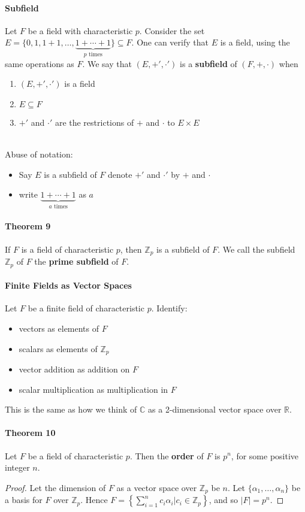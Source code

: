 \documentclass[10pt,letter]{article}
\theoremstyle{plain}
\theoremstyle{definition}
\begin{document}
\paragraph{Subfield}
Let $F$ be a field with characteristic $p$. Consider the set $E=\{0,1,1+1,\ldots,\underbrace{1+\cdots+1}_{p\text{ times}}\}\subseteq F$. One can verify that $E$ is a field, using the same operations as $F$. We say that $(E,+',\cdot')$ is a \textbf{subfield} of $(F,+,\cdot)$ when 
\begin{enumerate}
    \item $(E,+',\cdot')$ is a field 
    \item $E\subseteq F$ 
    \item $+'$ and $\cdot'$ are the restrictions of $+$ and $\cdot$ to $E\times E$
\end{enumerate}\mbox{}\\
Abuse of notation: 
\begin{itemize}
    \item Say $E$ is a subfield of $F$ denote $+'$ and $\cdot'$ by $+$ and $\cdot$
    \item write $\underbrace{1+\cdots+1}_{a\text{ times}}$ as $a$ 
\end{itemize}

\paragraph{Theorem 9}
If $F$ is a field of characteristic $p$, then $\mathbb{Z}_p$ is a subfield of $F$. We call the subfield $\mathbb{Z}_p$ of $F$ the \textbf{prime subfield} of $F$. 

\paragraph{Finite Fields as Vector Spaces}
Let $F$ be a finite field of characteristic $p$. Identify: 
\begin{itemize}
    \item vectors as elements of $F$ 
    \item scalars as elements of $\mathbb{Z}_p$ 
    \item vector addition as addition on $F$ 
    \item scalar multiplication as multiplication in $F$
\end{itemize}
This is the same as how we think of $\mathbb{C}$ as a 2-dimensional vector space over $\mathbb{R}$. 

\paragraph{Theorem 10}
Let $F$ be a field of characteristic $p$. Then the \textbf{order} of $F$ is $p^n$, for some positive integer $n$. 
\begin{proof}
     Let the dimension of $F$ as a vector space over $\mathbb{Z}_p$ be $n$. Let $\{\alpha_1,\ldots,\alpha_n\}$ be a basis for $F$ over $\mathbb{Z}_p$. Hence $F=\left\{\sum_{i=1}^nc_i\alpha_i|c_i\in\mathbb{Z}_p\right\}$, and so $|F|=p^n$. 
\end{proof}
\end{document}
